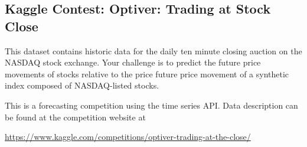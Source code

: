 \documentclass[11pt]{article}
\begin{document}
%    
%    
%    
%
%
\subsection{Kaggle Contest: Optiver: Trading at Stock Close}

This dataset contains historic data for the daily ten minute closing auction on the NASDAQ stock exchange. Your challenge is to predict the future price movements of stocks relative to the price future price movement of a synthetic index composed of NASDAQ-listed stocks.

This is a forecasting competition using the time series API. Data description can be found at the competition website at 

\url{https://www.kaggle.com/competitions/optiver-trading-at-the-close/}

%
%
\end{document}
